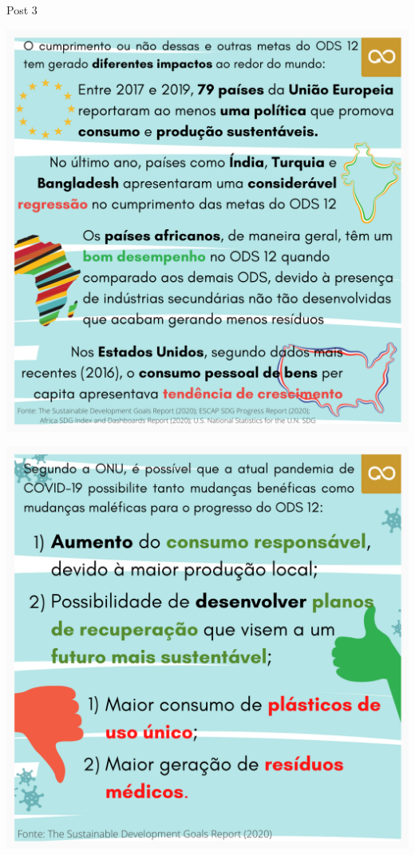 \documentclass{beamer}
\begin{document}
	\begin{frame}{Post 3}
		\begin{minipage}{0.49\linewidth}
			\centering
			\includegraphics[width=\linewidth]{Post 3/5.png}
		\end{minipage}
		\hfill
		\begin{minipage}{0.49\linewidth}
			\centering
			\includegraphics[width=\linewidth]{Post 3/6.png}
		\end{minipage}
	\end{frame}
	
\end{document}
